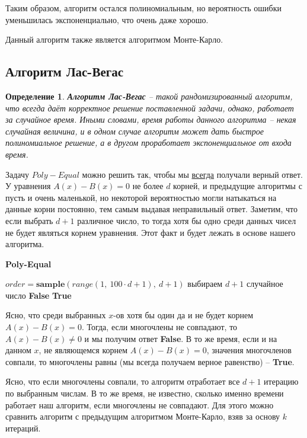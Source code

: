 \documentclass[a4paper,12pt]{article}
\newtheorem{definition}{Определение}
\begin{document}
Таким образом, алгоритм остался полиномиальным, но вероятность ошибки уменьшилась экспоненциально, что очень даже хорошо.

Данный алгоритм также является алгоритмом Монте-Карло.

\subsection{Алгоритм Лас-Вегас}

\begin{definition}
    \textbf{Алгоритм Лас-Вегас} -- такой рандомизированный алгоритм, что всегда даёт корректное решение поставленной задачи, однако, работает за случайное время. Иными словами, время работы данного алгоритма -- некая случайная величина, и в одном случае алгоритм может дать быстрое полиномиальное решение, а в другом проработает экспоненциальное от входа время.
\end{definition}

Задачу $Poly-Equal$ можно решить так, чтобы мы \underline{всегда} получали верный ответ. У уравнения $A(x) - B(x) = 0$ не более $d$ корней, и предыдущие алгоритмы с пусть и очень маленькой, но некоторой вероятностью могли натыкаться на данные корни постоянно, тем самым выдавая неправильный ответ. Заметим, что если выбрать $d + 1$ различное число, то тогда хотя бы одно среди данных чисел не будет являться корнем уравнения. Этот факт и будет лежать в основе нашего алгоритма.

\begin{algorithm}[H]
    \caption{\textbf{Poly-Equal}}
    \begin{algorithmic}[1]
        \Statex
        \State $order = \textbf{sample}(range(1,\ 100\cdot d + 1),\ d + 1)$ выбираем $d + 1$ случайное число
                \State\Return \textbf{False}
            \EndIf
        \EndFor
        \State \Return \textbf{True}
    \end{algorithmic}
\end{algorithm}

Ясно, что среди выбранных $x$-ов хотя бы один да и не будет корнем $A(x) - B(x) = 0$. Тогда, если многочлены не совпадают, то $A(x) - B(x) \neq 0$ и мы получим ответ \textbf{False}. В то же время, если и на данном $x$, не являющемся корнем $A(x) - B(x) = 0$, значения многочленов совпали, то многочлены равны (мы всегда получаем верное равенство) -- \textbf{True}.

Ясно, что если многочлены совпали, то алгоритм отработает все $d + 1$ итерацию по выбранным числам. В то же время, не известно, сколько именно времени работает наш алгоритм, если многочлены не совпадают. Для этого можно сравнить алгоритм с предыдущим алгоритмом Монте-Карло, взяв за основу $k$ итераций.
\end{document}
